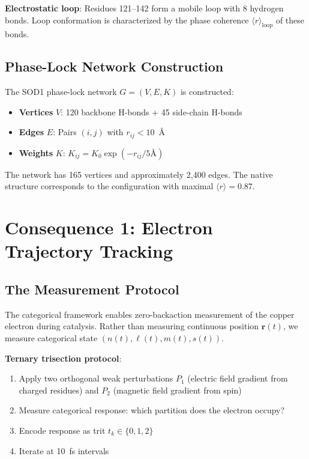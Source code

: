 \documentclass[twocolumn,aps,prx,superscriptaddress,longbibliography]{revtex4-2}
\theoremstyle{remark}
\newcommand{\orderpar}{\langle r \rangle}
\begin{document}
\textbf{Electrostatic loop}: Residues 121--142 form a mobile loop with
8 hydrogen bonds. Loop conformation is characterized by the phase
coherence $\orderpar_\text{loop}$ of these bonds.

\subsection{Phase-Lock Network Construction}

The SOD1 phase-lock network $G = (V, E, K)$ is constructed:

\begin{itemize}
    \item \textbf{Vertices} $V$: 120 backbone H-bonds + 45 side-chain H-bonds
    \item \textbf{Edges} $E$: Pairs $(i,j)$ with $r_{ij} < 10$~\AA
    \item \textbf{Weights} $K$: $K_{ij} = K_0 \exp(-r_{ij}/5\text{\AA})$
\end{itemize}

The network has 165 vertices and approximately 2,400 edges. The native
structure corresponds to the configuration with maximal $\orderpar = 0.87$.

\section{Consequence 1: Electron Trajectory Tracking}
\label{sec:electron}

\subsection{The Measurement Protocol}

The categorical framework enables zero-backaction measurement of the
copper electron during catalysis. Rather than measuring continuous
position $\mathbf{r}(t)$, we measure categorical state
$(n(t), \ell(t), m(t), s(t))$.

\textbf{Ternary trisection protocol}:
\begin{enumerate}
    \item Apply two orthogonal weak perturbations $P_1$ (electric field
    gradient from charged residues) and $P_2$ (magnetic field gradient
    from  spin)

    \item Measure categorical response: which partition does the electron
    occupy?

    \item Encode response as trit $t_k \in \{0, 1, 2\}$

    \item Iterate at 10~fs intervals
\end{enumerate}
\end{document}
